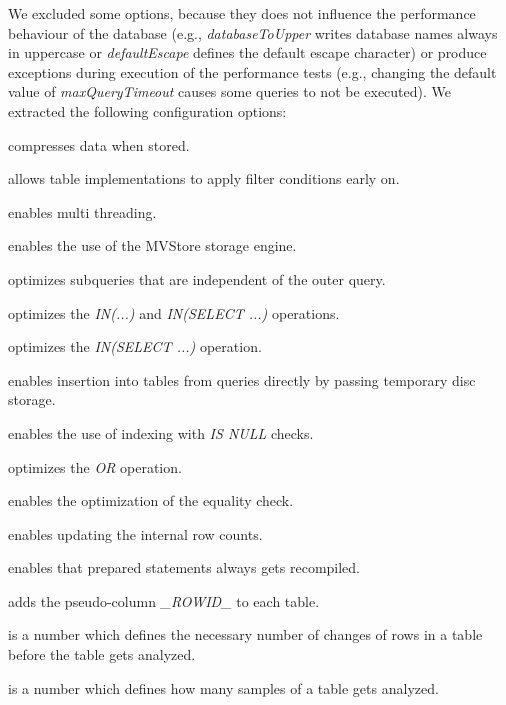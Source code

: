 We excluded some options, because they does not influence the performance behaviour of the database (e.g., \textit{databaseToUpper} writes database names always in uppercase or \textit{defaultEscape} defines the default escape character) or produce exceptions during execution of the performance tests (e.g., changing the default value of \textit{maxQueryTimeout} causes some queries to not be executed). We extracted the following configuration options:

\begin{description}[style=multiline,leftmargin=11em]
	\item [Compression] compresses data when stored.
	\item [EarlyFilter] allows table implementations to apply filter conditions early on.
	\item [MultiThreaded] enables multi threading.
	\item [MvStore] enables the use of the MVStore storage engine.
	\item [OptimizeEvalSubqueries] optimizes subqueries that are independent of the outer query.
	\item [OptimizeInList] optimizes the \textit{IN(...)} and \textit{IN(SELECT ...)} operations.
	\item [OptimizeInSelect] optimizes the \textit{IN(SELECT ...)} operation.
	\item [OptimizeInsertFromSelect] enables insertion into tables from queries directly by passing temporary disc storage.
	\item [OptimizeIsNull] enables the use of indexing with \textit{IS NULL} checks.
	\item [OptimizeOr] optimizes the \textit{OR} operation.
	\item [OptimizeTwoEquals] enables the optimization of the equality check.
	\item [PageStoreInternalCount] enables updating the internal row counts.
	\item [RecompileAlways] enables that prepared statements always gets recompiled.
	\item [RowID] adds the pseudo-column \textit{\_ROWID\_} to each table.
	\item [AnalyzeAuto] is a number which defines the necessary number of changes of rows in a table before the table gets analyzed.
	\item [AnalyzeSample] is a number which defines how many samples of a table gets analyzed.
\end{description}

